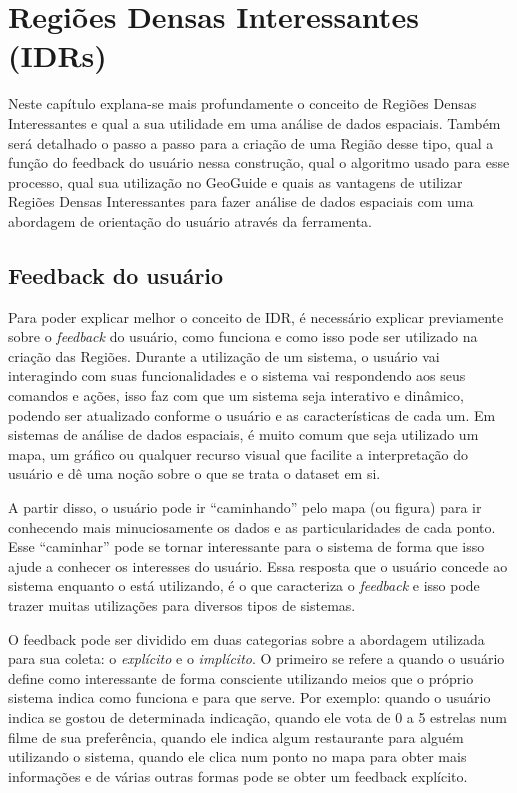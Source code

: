 \chapter{Regiões Densas Interessantes (IDRs)}
\label{chap:idrs}

Neste capítulo explana-se mais profundamente o conceito de Regiões Densas Interessantes e qual a sua utilidade em uma análise de dados espaciais. Também será detalhado o passo a passo para a criação de uma Região desse tipo, qual a função do feedback do usuário nessa construção, qual o algoritmo usado para esse processo, qual sua utilização no GeoGuide e quais as vantagens de utilizar Regiões Densas Interessantes para fazer análise de dados espaciais com uma abordagem de orientação do usuário através da ferramenta.

\section{Feedback do usuário}

Para poder explicar melhor o conceito de IDR, é necessário explicar previamente sobre o \textit{feedback} do usuário, como funciona e como isso pode ser utilizado na criação das Regiões. Durante a utilização de um sistema, o usuário vai interagindo com suas funcionalidades e o sistema vai respondendo aos seus comandos e ações, isso faz com que um sistema seja interativo e dinâmico, podendo ser atualizado conforme o usuário e as características de cada um. Em sistemas de análise de dados espaciais, é muito comum que seja utilizado um mapa, um gráfico ou qualquer recurso visual que facilite a interpretação do usuário e dê uma noção sobre o que se trata o dataset em si.

A partir disso, o usuário pode ir ``caminhando'' pelo mapa (ou figura) para ir conhecendo mais minuciosamente os dados e as particularidades de cada ponto. Esse ``caminhar'' pode se tornar interessante para o sistema de forma que isso ajude a conhecer os interesses do usuário. Essa resposta que o usuário concede ao sistema enquanto o está utilizando, é o que caracteriza o \textit{feedback} e isso pode trazer muitas utilizações para diversos tipos de sistemas.

O feedback pode ser dividido em duas categorias sobre a abordagem utilizada para sua coleta: o \textit{explícito} e o \textit{implícito}. O primeiro se refere a quando o usuário define como interessante de forma consciente utilizando meios que o próprio sistema indica como funciona e para que serve. Por exemplo: quando o usuário indica se gostou de determinada indicação, quando ele vota de 0 a 5 estrelas num filme de sua preferência, quando ele indica algum restaurante para alguém utilizando o sistema, quando ele clica num ponto no mapa para obter mais informações e de várias outras formas pode se obter um feedback explícito.

